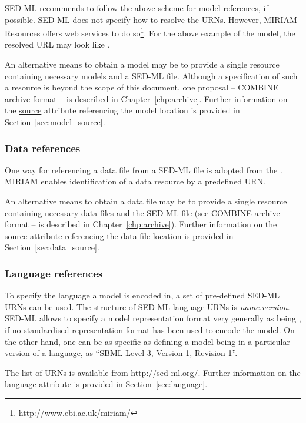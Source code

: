 SED-ML recommends to follow the above scheme for model references, if possible. 
SED-ML does not specify how to resolve the URNs. However, MIRIAM Resources offers web services to do so\footnote{\url{http://www.ebi.ac.uk/miriam/}}. For the above example of the  model, the resolved URL may look like .

An alternative means to obtain a model may be to provide a single resource containing necessary models and a SED-ML file. Although a specification of such a resource is beyond the scope of this document,  one proposal  --  COMBINE archive format -- is described in Chapter~\ref{chp:archive}.
Further information on the \hyperref[sec:model_source]{source} attribute referencing the model location is provided in Section~\ref{sec:model_source}.

\subsubsection{Data references}
\label{sec:dataURI}
One way for referencing a data file from a SED-ML file is adopted from the . MIRIAM enables identification of a data resource by a predefined URN.

An alternative means to obtain a data file may be to provide a single resource containing necessary data files and the SED-ML file (see COMBINE archive format -- is described in Chapter~\ref{chp:archive}). Further information on the \hyperref[sec:data_source]{source} attribute referencing the data file location is provided in Section~\ref{sec:data_source}.


\subsubsection{Language references}
\label{sec:languageURI}
To specify the language a model is encoded in, a set of pre-defined SED-ML URNs can be used. The structure of SED-ML language URNs is \emph{name.version}. SED-ML allows to specify a model representation format very generally as being , if no standardised representation format has been used to encode the model. On the other hand, one can be as specific as defining a model being in a particular version of a language, as ``SBML Level 3, Version 1, Revision 1''.

The list of URNs is available from \url{http://sed-ml.org/}. Further information on the \hyperref[sec:language]{language} attribute is provided in Section~\ref{sec:language}.

